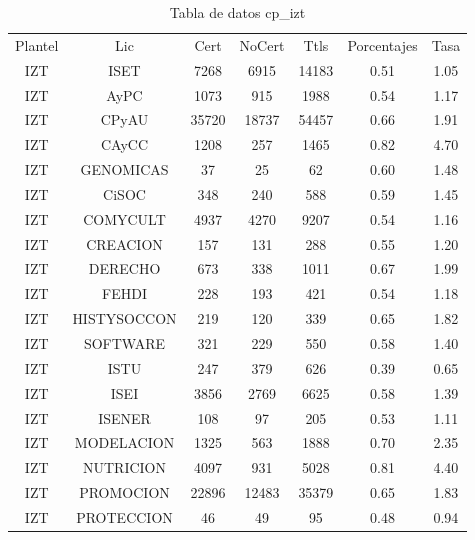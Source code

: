 \documentclass[12pt]{article}
\begin{document}
\begin{table}[h]
\centering
\begin{tabular}{ccccccc}

Plantel & Lic & Cert & NoCert & Ttls & Porcentajes & Tasa \\

IZT & ISET & 7268 & 6915 & 14183 & 0.51 & 1.05 \\
IZT & AyPC & 1073 & 915 & 1988 & 0.54 & 1.17 \\
IZT & CPyAU & 35720 & 18737 & 54457 & 0.66 & 1.91 \\
IZT & CAyCC & 1208 & 257 & 1465 & 0.82 & 4.70 \\
IZT & GENOMICAS & 37 & 25 & 62 & 0.60 & 1.48 \\
IZT & CiSOC & 348 & 240 & 588 & 0.59 & 1.45 \\
IZT & COMYCULT & 4937 & 4270 & 9207 & 0.54 & 1.16 \\
IZT & CREACION & 157 & 131 & 288 & 0.55 & 1.20 \\
IZT & DERECHO & 673 & 338 & 1011 & 0.67 & 1.99 \\
IZT & FEHDI & 228 & 193 & 421 & 0.54 & 1.18 \\
IZT & HISTYSOCCON & 219 & 120 & 339 & 0.65 & 1.82 \\
IZT & SOFTWARE & 321 & 229 & 550 & 0.58 & 1.40 \\
IZT & ISTU & 247 & 379 & 626 & 0.39 & 0.65 \\
IZT & ISEI & 3856 & 2769 & 6625 & 0.58 & 1.39 \\
IZT & ISENER & 108 & 97 & 205 & 0.53 & 1.11 \\
IZT & MODELACION & 1325 & 563 & 1888 & 0.70 & 2.35 \\
IZT & NUTRICION & 4097 & 931 & 5028 & 0.81 & 4.40 \\
IZT & PROMOCION & 22896 & 12483 & 35379 & 0.65 & 1.83 \\
IZT & PROTECCION & 46 & 49 & 95 & 0.48 & 0.94 \\

\end{tabular}
\caption{Tabla de datos cp\_izt}
\end{table}
\end{document}
